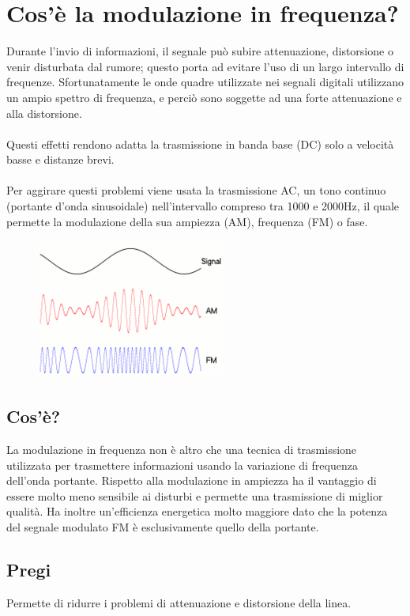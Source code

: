 \section{Cos’è la modulazione in frequenza?}

Durante l’invio di informazioni, il segnale può subire attenuazione, distorsione o venir disturbata dal rumore; questo porta ad evitare l’uso di un largo intervallo di frequenze. Sfortunatamente le onde quadre utilizzate nei segnali digitali utilizzano un ampio spettro di frequenza, e perciò sono soggette ad una forte attenuazione e alla distorsione.
\\\\
Questi effetti rendono adatta la trasmissione in banda base (DC) solo a velocità basse e distanze brevi.
\\\\
Per aggirare questi problemi viene usata la trasmissione AC, un tono continuo (portante d’onda sinusoidale) nell’intervallo compreso tra 1000 e 2000Hz, il quale permette la modulazione della sua ampiezza (AM), frequenza (FM) o fase.

\begin{figure}[H]
\centering
\includegraphics[scale=1]{res/img/5_modulazione.png}
\end{figure}
\subsection{Cos'è?}
La modulazione in frequenza non è altro che una tecnica di trasmissione utilizzata per trasmettere informazioni usando la variazione di frequenza dell’onda portante. Rispetto alla modulazione in ampiezza ha il vantaggio di essere molto meno sensibile ai disturbi e permette una trasmissione di miglior qualità. Ha inoltre un’efficienza energetica molto maggiore dato che la potenza del segnale modulato FM è esclusivamente quello della portante.

\subsection{Pregi}
Permette di ridurre i problemi di attenuazione e distorsione della linea.
